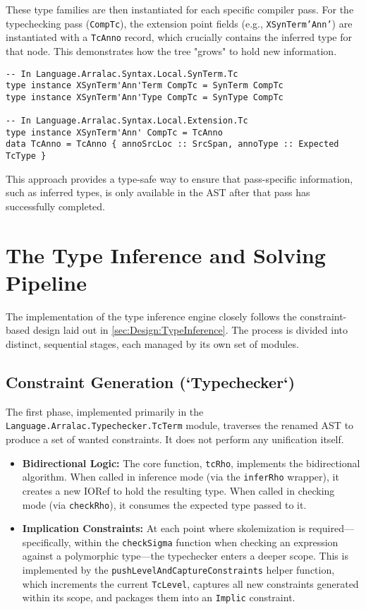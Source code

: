 These type families are then instantiated for each specific compiler pass. For the typechecking pass (\texttt{CompTc}), the extension point fields (e.g., \texttt{XSynTerm'Ann'}) are instantiated with a \texttt{TcAnno} record, which crucially contains the inferred type for that node. This demonstrates how the tree "grows" to hold new information.

\begin{verbatim}
-- In Language.Arralac.Syntax.Local.SynTerm.Tc
type instance XSynTerm'Ann'Term CompTc = SynTerm CompTc
type instance XSynTerm'Ann'Type CompTc = SynType CompTc

-- In Language.Arralac.Syntax.Local.Extension.Tc
type instance XSynTerm'Ann' CompTc = TcAnno
data TcAnno = TcAnno { annoSrcLoc :: SrcSpan, annoType :: Expected TcType }
\end{verbatim}

This approach provides a type-safe way to ensure that pass-specific information, such as inferred types, is only available in the AST after that pass has successfully completed.

\section{The Type Inference and Solving Pipeline}
\label{sec:Implementation:Pipeline}

The implementation of the type inference engine closely follows the constraint-based design laid out in \cref{sec:Design:TypeInference}. The process is divided into distinct, sequential stages, each managed by its own set of modules.

\subsection{Constraint Generation (`Typechecker`)}
The first phase, implemented primarily in the \texttt{Language.Arralac.Typechecker.TcTerm} module, traverses the renamed AST to produce a set of wanted constraints. It does not perform any unification itself.
\begin{itemize}
  \item \textbf{Bidirectional Logic:} The core function, \texttt{tcRho}, implements the bidirectional algorithm. When called in inference mode (via the \texttt{inferRho} wrapper), it creates a new IORef to hold the resulting type. When called in checking mode (via \texttt{checkRho}), it consumes the expected type passed to it.

  \item \textbf{Implication Constraints:} At each point where skolemization is required---specifically, within the \texttt{checkSigma} function when checking an expression against a polymorphic type---the typechecker enters a deeper scope. This is implemented by the \texttt{pushLevelAndCaptureConstraints} helper function, which increments the current \texttt{TcLevel}, captures all new constraints generated within its scope, and packages them into an \texttt{Implic} constraint.
\end{itemize}

